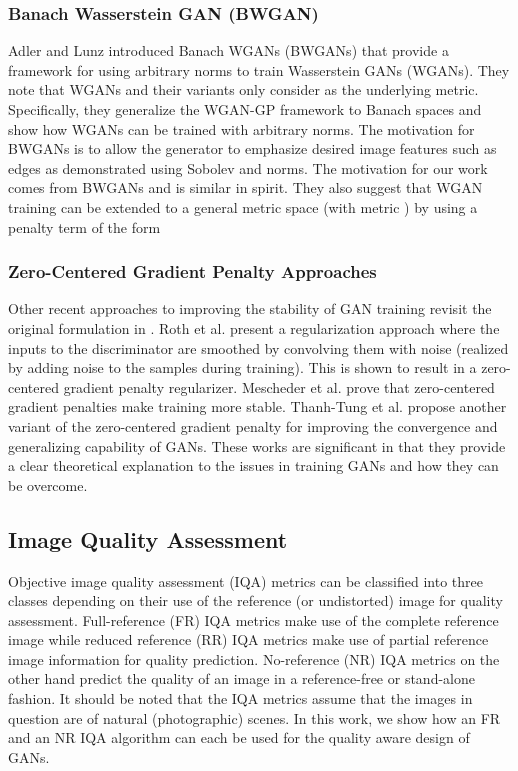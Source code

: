 \documentclass{article}
\begin{document}
\subsubsection{Banach Wasserstein GAN (BWGAN)}
\label{sssec:bwgan}
Adler and Lunz \cite{adler2018banach} introduced
Banach WGANs (BWGANs) that provide a framework for using arbitrary norms to train Wasserstein GANs (WGANs). They note that WGANs and their variants only consider  as the underlying metric. Specifically, they generalize the WGAN-GP framework to Banach spaces and show how WGANs can be trained with arbitrary norms.
The motivation for BWGANs is to allow the generator to emphasize desired image features such as edges as demonstrated using Sobolev and  norms. The motivation for our work comes from BWGANs and is similar in spirit. They also suggest that WGAN training can be extended to a general metric space (with metric ) by using a penalty term of the form

\subsubsection{Zero-Centered Gradient Penalty Approaches}
\label{sssec:other}
Other recent approaches to improving the stability of GAN training revisit the original formulation in \cite{goodfellow2014generative}. Roth et al. \cite{roth2017stabilizing} present a regularization approach where the inputs to the discriminator are smoothed by convolving them with noise (realized by adding noise to the samples during training). This is shown to result in a zero-centered gradient penalty regularizer. Mescheder et al. \cite{mescheder2018training} prove that zero-centered gradient penalties make training more stable. Thanh-Tung et al. \cite{thanh2019improving} propose another variant of the zero-centered gradient penalty for improving the convergence and generalizing capability of GANs. These works are significant in that they provide a clear theoretical explanation to the issues in training GANs and how they can be overcome.  
\subsection{Image Quality Assessment}
\label{ssec:iqa}
Objective image quality assessment (IQA) metrics can be classified into three classes depending on their use of the reference (or undistorted) image for quality assessment. Full-reference (FR) IQA metrics make use of the complete reference image while reduced reference (RR) IQA metrics make use of partial reference image information for quality prediction. No-reference (NR) IQA metrics on the other hand predict the quality of an image in a reference-free or stand-alone fashion. It should be noted that the IQA metrics assume that the images in question are of natural (photographic) scenes. In this work, we show how an FR and an NR IQA algorithm can each be used for the quality aware design of GANs.
\end{document}
